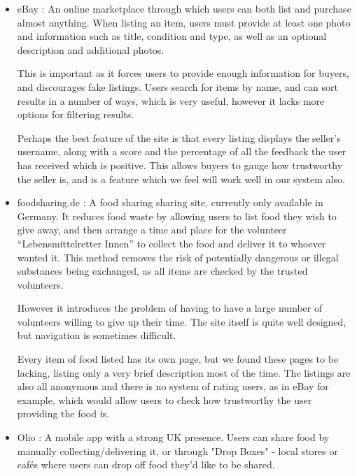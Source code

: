 \documentclass[12pt]{article}
\begin{document}
\begin{itemize}

    \item eBay \cite{ebay}: An online marketplace through which users can both list and
        purchase almost anything. When listing an item, users must provide at
        least one photo and information such as title, condition and type, as
        well as an optional description and additional photos.

        This is important as it forces users to provide enough information
        for buyers, and discourages fake listings.
        Users search for items by name, and can sort results in a number of
        ways, which is very useful, however it lacks more options for filtering
        results.
        
        Perhaps the best feature of the site is that every listing displays
        the seller’s username, along with a score and the percentage of all
        the feedback the user has received which is positive.
        This allows buyers to gauge how trustworthy the seller is, and is a
        feature which we feel will work well in our system also.


    \item foodsharing.de \cite{foodsharing}: A food sharing sharing site, currently only available
        in Germany.
        It reduces food waste by allowing users to list food they wish to give
        away, and then arrange a time and place for the volunteer
        “Lebensmittelretter Innen” to collect the food and deliver it to
        whoever wanted it.
        This method removes the risk of potentially dangerous or illegal
        substances being exchanged, as all items are checked by the trusted
        volunteers.
        
        However it introduces the problem of having to have a large number of
        volunteers willing to give up their time. The site itself is quite well
        designed, but navigation is sometimes difficult.

        Every item of food listed has its own page, but we found these pages to
        be lacking, listing only a very brief description most of the time.
        The listings are also all anonymous and there is no system of rating
        users, as in eBay for example, which would allow users to check how
        trustworthy the user providing the food is.
    
    \item Olio \cite{olio}: A mobile app with a strong UK presence.
        Users can share food by manually collecting/delivering it, or through
        "Drop Boxes" - local stores or cafés where users can drop off food
        they'd like to be shared.
        

\end{itemize}
\end{document}
